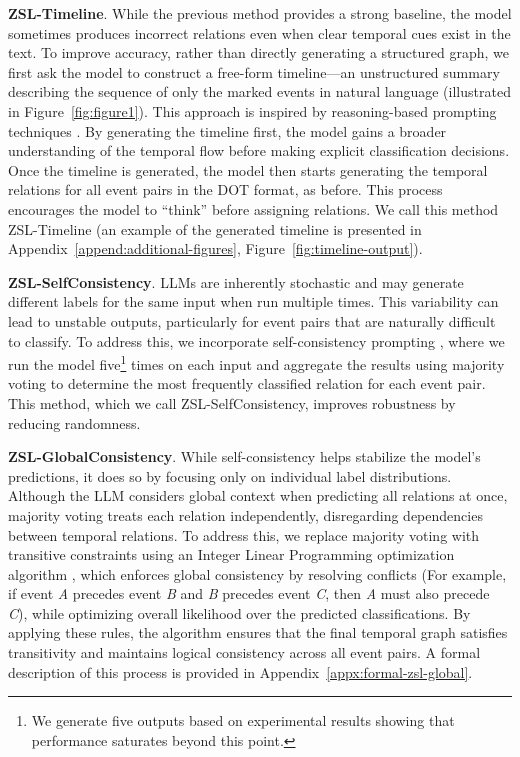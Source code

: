 \textbf{ZSL-Timeline}. While the previous method provides a strong baseline, the model sometimes produces incorrect relations even when clear temporal cues exist in the text.
To improve accuracy, rather than directly generating a structured graph, we first ask the model to construct a free-form timeline—an unstructured summary describing the sequence of only the marked events in natural language (illustrated in Figure~\ref{fig:figure1}). This approach is inspired by reasoning-based prompting techniques \cite{wang-etal-2023-plan, sun-etal-2024-pearl}. By generating the timeline first, the model gains a broader understanding of the temporal flow before making explicit classification decisions. Once the timeline is generated, the model then starts generating the temporal relations for all event pairs in the DOT format, as before. This process encourages the model to ``think'' before assigning relations. We call this method ZSL-Timeline (an example of the generated timeline is presented in Appendix~\ref{append:additional-figures}, Figure~\ref{fig:timeline-output}).


\textbf{ZSL-SelfConsistency}. LLMs are inherently stochastic and may generate different labels for the same input when run multiple times. This variability can lead to unstable outputs, particularly for event pairs that are naturally difficult to classify. To address this, we incorporate self-consistency prompting \cite{wang2023selfconsistency}, where we run the model five\footnote{We generate five outputs based on experimental results showing that performance saturates beyond this point.} times on each input and aggregate the results using majority voting to determine the most frequently classified relation for each event pair. This method, which we call ZSL-SelfConsistency, improves robustness by reducing randomness.

\textbf{ZSL-GlobalConsistency}. While self-consistency helps stabilize the model’s predictions, it does so by focusing only on individual label distributions. Although the LLM considers global context when predicting all relations at once, majority voting treats each relation independently, disregarding dependencies between temporal relations.
To address this, we replace majority voting with transitive constraints using an Integer Linear Programming optimization algorithm \cite{ning-etal-2018-joint}, which enforces global consistency by resolving conflicts (For example, if event \textit{A} precedes event \textit{B} and \textit{B} precedes event \textit{C}, then \textit{A} must also precede \textit{C}), while optimizing overall likelihood over the predicted classifications. By applying these rules, the algorithm ensures that the final temporal graph satisfies transitivity and maintains logical consistency across all event pairs. A formal description of this process is provided in Appendix~\ref{appx:formal-zsl-global}.

